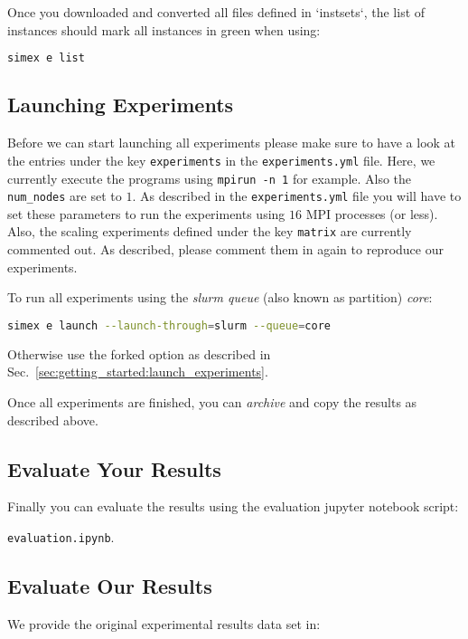 \documentclass[11pt, a4paper]{scrartcl}
\newcommand{\expfile}{\texttt{experiments.yml} file\xspace}
\begin{document}
Once you downloaded and converted all files defined in `instsets`, the list of
instances should mark all instances in green when using:

\begin{lstlisting}[language=bash]
simex e list
\end{lstlisting}

\subsection{Launching Experiments}

Before we can start launching all experiments please make sure to have a look at
the entries under the key \texttt{experiments} in the \expfile. Here, we
currently execute the programs using \texttt{mpirun -n 1} for example. Also the
\texttt{num\_nodes} are set to $1$. As described in the \expfile you will have to
set these parameters to run the experiments using $16$ MPI processes (or less).
Also, the scaling experiments defined under the key \texttt{matrix} are
currently commented out. As described, please comment them in again to reproduce
our experiments.

To run all experiments using the \emph{slurm queue} (also known as partition)
\emph{core}:

\begin{lstlisting}[language=bash]
simex e launch --launch-through=slurm --queue=core
\end{lstlisting}

Otherwise use the forked option as described in
Sec.~\ref{sec:getting_started:launch_experiments}.

Once all experiments are finished, you can \emph{archive} and copy the results
as described above.

\subsection{Evaluate Your Results}

Finally you can evaluate the results using the evaluation jupyter notebook
script:

\texttt{evaluation.ipynb}.

\subsection{Evaluate Our Results}

We provide the original experimental results data set in:
\end{document}
